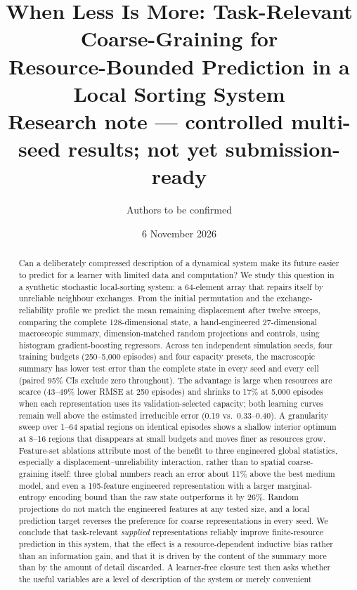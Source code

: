 \documentclass[11pt,a4paper]{article}
\title{When Less Is More: Task-Relevant Coarse-Graining for\\
  Resource-Bounded Prediction in a Local Sorting System\\[0.4em]
  \large Research note --- controlled multi-seed results; not yet submission-ready}
\author{Authors to be confirmed}
\date{6 November 2026}
\begin{document}
\maketitle

\begin{abstract}
Can a deliberately compressed description of a dynamical system make its future
easier to predict for a learner with limited data and computation? We study this
question in a synthetic stochastic local-sorting system: a 64-element array that
repairs itself by unreliable neighbour exchanges. From the initial permutation and
the exchange-reliability profile we predict the mean remaining displacement after
twelve sweeps, comparing the complete 128-dimensional state, a hand-engineered
27-dimensional macroscopic summary, dimension-matched random projections and
controls, using histogram gradient-boosting regressors. Across ten independent
simulation seeds, four training budgets (250--5,000 episodes) and four capacity
presets, the macroscopic summary has lower test error than the complete state in
every seed and every cell (paired 95\% CIs exclude zero throughout). The advantage
is large when resources are scarce (43--49\% lower RMSE at 250 episodes) and
shrinks to 17\% at 5,000 episodes when each representation uses its
validation-selected capacity; both learning curves remain well above the estimated
irreducible error (0.19 vs.\ 0.33--0.40). A granularity sweep over 1--64 spatial
regions on identical episodes shows a shallow interior optimum at 8--16 regions
that disappears at small budgets and moves finer as resources grow. Feature-set
ablations attribute most of the benefit to three engineered global statistics,
especially a displacement--unreliability interaction, rather than to spatial
coarse-graining itself: three global numbers reach an error about 11\% above the best medium model,
and even a 195-feature engineered representation with a larger marginal-entropy encoding bound than
the raw state outperforms it by 26\%. Random projections do not match the engineered features at any tested
size, and a local prediction target reverses the preference for coarse
representations in every seed. We conclude that task-relevant \emph{supplied}
representations reliably improve finite-resource prediction in this system, that
the effect is a resource-dependent inductive bias rather than an information gain,
and that it is driven by the content of the summary more than by the amount of
detail discarded. A learner-free closure test then asks whether the useful
variables are a level of description of the system or merely convenient

\end{abstract}
\end{document}
